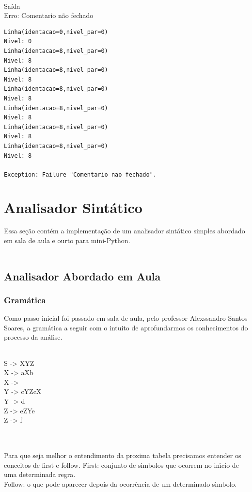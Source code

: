 \documentclass{article}
\begin{document}
\\Saída
\\Erro: Comentario não fechado
\begin{lstlisting}
Linha(identacao=0,nivel_par=0)
Nivel: 0
Linha(identacao=8,nivel_par=0)
Nivel: 8
Linha(identacao=8,nivel_par=0)
Nivel: 8
Linha(identacao=8,nivel_par=0)
Nivel: 8
Linha(identacao=8,nivel_par=0)
Nivel: 8
Linha(identacao=8,nivel_par=0)
Nivel: 8
Linha(identacao=8,nivel_par=0)
Nivel: 8

Exception: Failure "Comentario nao fechado".
\end{lstlisting}



\section{Analisador Sintático}
Essa seção contém a implementação de um analisador sintático simples abordado em sala de aula e ourto para mini-Python.\\\

\subsection{Analisador Abordado em Aula}

\subsubsection{Gramática}
Como passo inicial foi passado em sala de aula, pelo professor Alexssandro Santos Soares, a gramática a seguir com o intuito de aprofundarmos os conhecimentos do processo da análise.\\\

{\raggedright
S -> XYZ\\
X -> aXb\\
X ->\\
Y -> cYZcX\\
Y -> d\\
Z -> eZYe\\
Z -> f\\
}
\\
\
\\Para que seja melhor o entendimento da proxima tabela precisamos entender os conceitos de first e follow.
First: conjunto de sı́mbolos que ocorrem no inı́cio de uma determinada regra.\\ 
Follow: o que pode aparecer depois da ocorrência de um determinado sı́mbolo.\\
\end{document}

